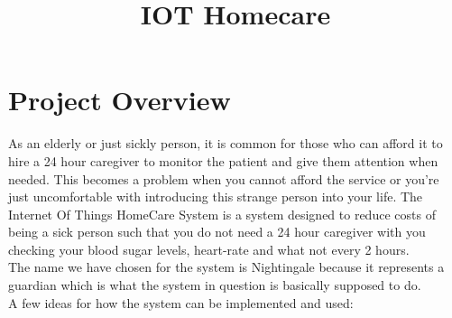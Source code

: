 \documentclass[12pt]{article}
\title{IOT Homecare}
\begin{document}
    \newcommand{\titleimage}{iot.png}
    
    
    
	

	\newpage

	\section{Project Overview}
	As an elderly or just sickly person, it is common for those who can afford it to hire a 24 hour caregiver to monitor the patient and give them attention when needed. This becomes a problem when you cannot afford the service or you're just uncomfortable with introducing this strange person into your life. The Internet Of Things HomeCare System is a system designed to reduce costs of being a sick person such that you do not need a 24 hour caregiver with you checking your blood sugar levels, heart-rate and what not every 2 hours. \\
	
	The name we have chosen for the system is Nightingale because it represents a guardian which is what the system in question is basically supposed to do.\\
	
	A few ideas for how the system can be implemented and used:
	
\end{document}
